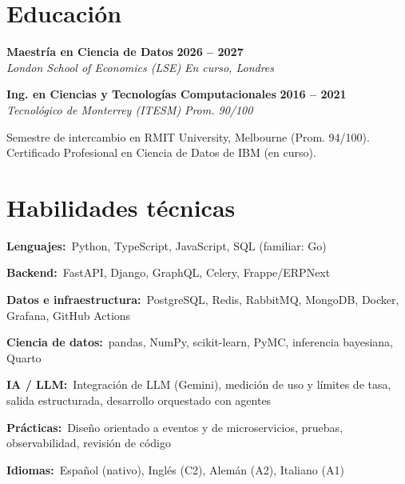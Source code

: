 \documentclass[10pt,a4paper]{article}
\newcommand{\rol}[4]{%
  \textbf{#1} \hfill \textbf{#3}\\[1pt]
  {\color{soft}\textit{#2} \hfill \textit{#4}}\par\vspace{2pt}}
\newcommand{\hab}[2]{\textbf{\color{soft}#1:}\ #2\par\vspace{1.5pt}}
\begin{document}
\section*{Educación}
\rol{Maestría en Ciencia de Datos}{London School of Economics (LSE)}{2026 -- 2027}{En curso, Londres}
\vspace{2pt}
\rol{Ing. en Ciencias y Tecnologías Computacionales}{Tecnológico de Monterrey (ITESM)}{2016 -- 2021}{Prom. 90/100}
\vspace{1pt}
{\color{soft}\small Semestre de intercambio en RMIT University, Melbourne (Prom. 94/100). Certificado Profesional en Ciencia de Datos de IBM (en curso).}

\section*{Habilidades técnicas}
\hab{Lenguajes}{Python, TypeScript, JavaScript, SQL \;(familiar: Go)}
\hab{Backend}{FastAPI, Django, GraphQL, Celery, Frappe/ERPNext}
\hab{Datos e infraestructura}{PostgreSQL, Redis, RabbitMQ, MongoDB, Docker, Grafana, GitHub Actions}
\hab{Ciencia de datos}{pandas, NumPy, scikit-learn, PyMC, inferencia bayesiana, Quarto}
\hab{IA / LLM}{Integración de LLM (Gemini), medición de uso y límites de tasa, salida estructurada, desarrollo orquestado con agentes}
\hab{Prácticas}{Diseño orientado a eventos y de microservicios, pruebas, observabilidad, revisión de código}
\hab{Idiomas}{Español (nativo), Inglés (C2), Alemán (A2), Italiano (A1)}
\end{document}
